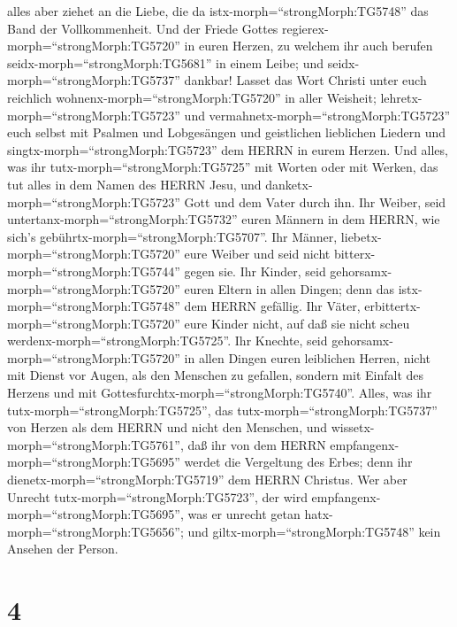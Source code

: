 alles aber ziehet an die Liebe, die da istx-morph=``strongMorph:TG5748''
das Band der Vollkommenheit.  Und der Friede Gottes
regierex-morph=``strongMorph:TG5720'' in euren Herzen, zu welchem ihr
auch berufen seidx-morph=``strongMorph:TG5681'' in einem Leibe; und
seidx-morph=``strongMorph:TG5737'' dankbar!  Lasset das
Wort Christi unter euch reichlich wohnenx-morph=``strongMorph:TG5720''
in aller Weisheit; lehretx-morph=``strongMorph:TG5723'' und
vermahnetx-morph=``strongMorph:TG5723'' euch selbst mit Psalmen und
Lobgesängen und geistlichen lieblichen Liedern und
singtx-morph=``strongMorph:TG5723'' dem HERRN in eurem Herzen.
 Und alles, was ihr tutx-morph=``strongMorph:TG5725'' mit
Worten oder mit Werken, das tut alles in dem Namen des HERRN Jesu, und
danketx-morph=``strongMorph:TG5723'' Gott und dem Vater durch ihn.
 Ihr Weiber, seid untertanx-morph=``strongMorph:TG5732''
euren Männern in dem HERRN, wie sich's
gebührtx-morph=``strongMorph:TG5707''.  Ihr Männer,
liebetx-morph=``strongMorph:TG5720'' eure Weiber und seid nicht
bitterx-morph=``strongMorph:TG5744'' gegen sie.  Ihr
Kinder, seid gehorsamx-morph=``strongMorph:TG5720'' euren Eltern in
allen Dingen; denn das istx-morph=``strongMorph:TG5748'' dem HERRN
gefällig.  Ihr Väter,
erbittertx-morph=``strongMorph:TG5720'' eure Kinder nicht, auf daß sie
nicht scheu werdenx-morph=``strongMorph:TG5725''.  Ihr
Knechte, seid gehorsamx-morph=``strongMorph:TG5720'' in allen Dingen
euren leiblichen Herren, nicht mit Dienst vor Augen, als den Menschen zu
gefallen, sondern mit Einfalt des Herzens und mit
Gottesfurchtx-morph=``strongMorph:TG5740''.  Alles, was ihr
tutx-morph=``strongMorph:TG5725'', das tutx-morph=``strongMorph:TG5737''
von Herzen als dem HERRN und nicht den Menschen,  und
wissetx-morph=``strongMorph:TG5761'', daß ihr von dem HERRN
empfangenx-morph=``strongMorph:TG5695'' werdet die Vergeltung des Erbes;
denn ihr dienetx-morph=``strongMorph:TG5719'' dem HERRN Christus.
 Wer aber Unrecht tutx-morph=``strongMorph:TG5723'', der
wird empfangenx-morph=``strongMorph:TG5695'', was er unrecht getan
hatx-morph=``strongMorph:TG5656''; und
giltx-morph=``strongMorph:TG5748'' kein Ansehen der Person.

\hypertarget{section-3}{%
\section{4}\label{section-3}}

